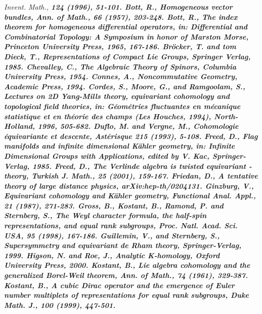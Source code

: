 \documentclass[a4paper,a4paper]{article}
\theoremstyle{conjecture}
\begin{document}
\begin{thebibliography}{99}
\it Invent. Math.,
\bf 124
\rm (1996), 51-101.
\rm Bott, R.,
\rm Homogeneous vector bundles,
\it Ann. of Math.,
\bf 66
\rm (1957), 203-248.
\rm Bott, R.,
\rm The index theorem for homogeneous differential operators, in:
\it Differential and Combinatorial Topology: A Symposium in honor
of Marston Morse,
\rm Princeton University Press, 1965, 167-186.
Br\"ocker, T. and tom Dieck, T.,
\it Representations of Compact Lie Groups,
\rm Springer Verlag, 1985.
\rm Chevalley, C., \it The Algebraic Theory of Spinors, \rm
Columbia University Press, 1954.
\rm Connes, A.,
\it Noncommutative Geometry,
\rm Academic Press, 1994.
\rm Cordes, S., Moore, G., and Ramgoolam, S.,
\rm Lectures on 2D Yang-Mills theory, equivariant cohomology and topological field theories, in:
\it G\'eom\'etries fluctuantes en m\'ecanique statistique et en
th\'eorie des champs (Les Houches, 1994),
\rm North-Holland, 1996, 505-682.
\rm Duflo, M. and Vergne, M.,
\rm Cohomologie \'equivariante et descente,
\it Ast\'erisque \bf 215
\rm (1993), 5-108.
\rm Freed, D.,
\rm Flag manifolds and infinite dimensional K\"ahler geometry, in:
\it Infinite Dimensional Groups with Applications, edited by V. Kac,
\rm Springer-Verlag, 1985.
\rm Freed, D.,
\rm The Verlinde algebra is twisted equivariant \coordHE{}-theory,
\rm Turkish J. Math.,
\bf 25
\rm (2001), 159-167.
\rm Friedan, D.,
\rm A tentative theory of large distance physics,
\rm arXiv:hep-th/0204131.
\rm Ginzburg, V.,
\rm Equivariant cohomology and K\"ahler geometry,
\it Functional Anal. Appl.,
\bf 21
\rm (1987), 271-283.
\rm Gross, B., Kostant, B., Ramond, P. and Sternberg, S.,
\rm The Weyl character formula, the half-spin representations,
and equal rank subgroups,
\it Proc. Natl. Acad. Sci. USA,
\bf 95
\rm (1998), 167-186.
\rm Guillemin, V., and Sternberg, S.,
\it Supersymmetry and equivariant de Rham theory,
\rm Springer-Verlag, 1999.
\rm Higson, N. and Roe, J.,
\it Analytic K-homology,
\rm Oxford University Press, 2000.
\rm Kostant, B., \rm Lie algebra cohomology and the generalized
Borel-Weil theorem, \it Ann. of Math., \bf 74 \rm (1961), 329-387.
\rm Kostant, B.,
\rm A cubic Dirac operator and the emergence of Euler number multiplets
of representations for equal rank subgroups,
\it Duke Math. J.,
\bf 100 \rm (1999), 447-501.

\end{thebibliography}
\end{document}
